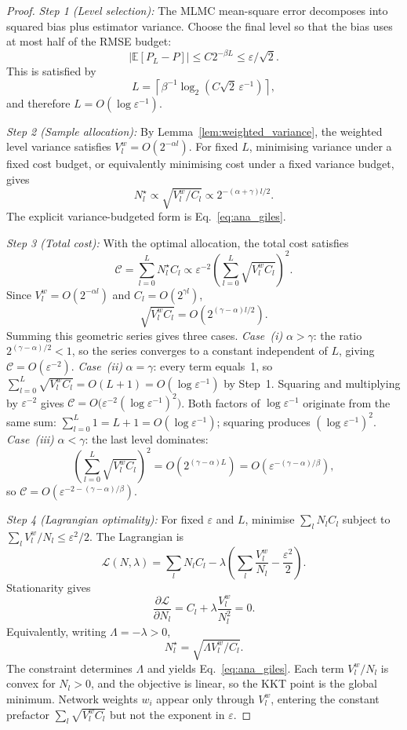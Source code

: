 \documentclass{ieeeaccess}
\begin{document}
\begin{proof}
\textit{Step 1 (Level selection):}
The MLMC mean-square error decomposes into squared bias plus estimator variance. Choose the final
level so that the bias uses at most half of the RMSE budget:
\[
|\mathbb{E}[P_L-P]| \leq C2^{-\beta L}\leq \varepsilon/\sqrt{2}.
\]
This is satisfied by
\[
L=\left\lceil \beta^{-1}\log_2(C\sqrt{2}\,\varepsilon^{-1})\right\rceil,
\]
and therefore $L=O(\log\varepsilon^{-1})$.

\textit{Step 2 (Sample allocation):}
By Lemma~\ref{lem:weighted_variance}, the weighted level variance satisfies
$V_l^w=O(2^{-\alpha l})$. For fixed $L$, minimising variance under a fixed cost budget, or
equivalently minimising cost under a fixed variance budget, gives
\[
N_l^\star \propto \sqrt{V_l^w/C_l}
\propto 2^{-(\alpha+\gamma)l/2}.
\]
The explicit variance-budgeted form is Eq.~\eqref{eq:ana_giles}.

\textit{Step 3 (Total cost):}
With the optimal allocation, the total cost satisfies
\[
\mathcal{C}=\sum_{l=0}^{L}N_l^\star C_l
\propto \varepsilon^{-2}\left(\sum_{l=0}^{L}\sqrt{V_l^w C_l}\right)^2.
\]
Since $V_l^w=O(2^{-\alpha l})$ and $C_l=O(2^{\gamma l})$,
\[
\sqrt{V_l^w C_l}=O\!\left(2^{(\gamma-\alpha)l/2}\right).
\]
Summing this geometric series gives three cases.
\textit{Case~(i)} $\alpha>\gamma$: the ratio $2^{(\gamma-\alpha)/2}<1$, so the series
converges to a constant independent of $L$, giving $\mathcal{C}=O(\varepsilon^{-2})$.
\textit{Case~(ii)} $\alpha=\gamma$: every term equals~1, so
$\sum_{l=0}^L\sqrt{V_l^w C_l}=O(L+1)=O(\log\varepsilon^{-1})$ by Step~1.
Squaring and multiplying by $\varepsilon^{-2}$ gives
$\mathcal{C}=O\!\bigl(\varepsilon^{-2}(\log\varepsilon^{-1})^2\bigr)$.
Both factors of $\log\varepsilon^{-1}$ originate from the same sum:
$\sum_{l=0}^L 1 = L+1 = O(\log\varepsilon^{-1})$; squaring produces $(\log\varepsilon^{-1})^2$.
\textit{Case~(iii)} $\alpha<\gamma$: the last level dominates:
\[
\left(\sum_{l=0}^{L}\sqrt{V_l^wC_l}\right)^2
=O\!\left(2^{(\gamma-\alpha)L}\right)
=O\!\left(\varepsilon^{-(\gamma-\alpha)/\beta}\right),
\]
so $\mathcal{C}=O(\varepsilon^{-2-(\gamma-\alpha)/\beta})$.

\textit{Step 4 (Lagrangian optimality):}
For fixed $\varepsilon$ and $L$, minimise $\sum_l N_lC_l$ subject to
$\sum_l V_l^w/N_l\leq\varepsilon^2/2$. The Lagrangian is
\[
\mathcal{L}(N,\lambda)=
\sum_l N_lC_l-\lambda\left(\sum_l\frac{V_l^w}{N_l}-\frac{\varepsilon^2}{2}\right).
\]
Stationarity gives
\[
\frac{\partial\mathcal{L}}{\partial N_l}
=C_l+\lambda\frac{V_l^w}{N_l^2}=0.
\]
Equivalently, writing $\Lambda=-\lambda>0$,
\[
N_l^\star=\sqrt{\Lambda V_l^w/C_l}.
\]
The constraint determines $\Lambda$ and yields Eq.~\eqref{eq:ana_giles}. Each term
$V_l^w/N_l$ is convex for $N_l>0$, and the objective is linear, so the KKT point is the global
minimum. Network weights $w_i$ appear only through $V_l^w$, entering the constant prefactor
$\sum_l\sqrt{V_l^wC_l}$ but not the exponent in $\varepsilon$.
\end{proof}
\end{document}
